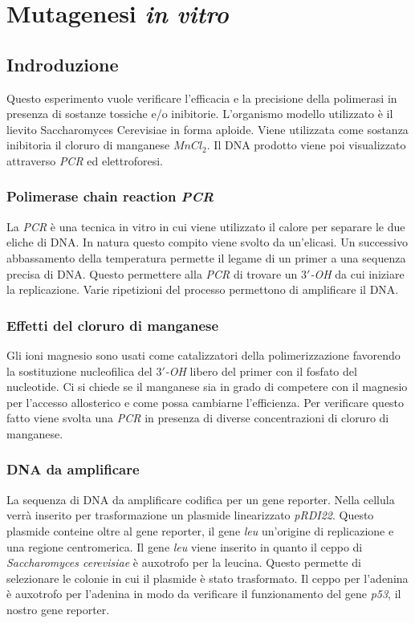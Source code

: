 \section*{Mutagenesi \emph{in vitro}}

	\subsection*{Indroduzione}
        Questo esperimento vuole verificare l'efficacia e la precisione della polimerasi in presenza di sostanze tossiche e/o inibitorie.
        L'organismo modello utilizzato è il lievito Saccharomyces Cerevisiae in forma aploide.
	Viene utilizzata come sostanza inibitoria il cloruro di manganese \emph{$MnCl_2$}.
	Il DNA prodotto viene poi visualizzato attraverso \emph{PCR} ed elettroforesi.
        
		\subsubsection*{Polimerase chain reaction \emph{PCR}}
		La \emph{PCR} \`e una tecnica in vitro in cui viene utilizzato il calore per separare le due eliche di DNA.
		In natura questo compito viene svolto da un'elicasi.
       		Un successivo abbassamento della temperatura permette il legame di un primer a una sequenza precisa di DNA.
		Questo permettere alla \emph{PCR} di trovare un \emph{$3'$-OH} da cui iniziare la replicazione.
		Varie ripetizioni del processo permettono di amplificare il DNA.

		\subsubsection*{Effetti del cloruro di manganese}
		Gli ioni magnesio sono usati come catalizzatori della polimerizzazione favorendo la sostituzione nucleofilica del \emph{$3'$-OH} libero del primer con il fosfato del nucleotide.
		Ci si chiede se il manganese sia in grado di competere con il magnesio per l'accesso allosterico e come possa cambiarne l'efficienza.
		Per verificare questo fatto viene svolta una \emph{PCR} in presenza di diverse concentrazioni di cloruro di manganese.

		\subsubsection*{DNA da amplificare}
        	La sequenza di DNA da amplificare codifica per un gene reporter.
		Nella cellula verrà inserito per trasformazione un plasmide linearizzato \emph{pRDI22}.
		Questo plasmide conteine oltre al gene reporter, il gene \emph{leu} un'origine di replicazione e una regione centromerica.
		Il gene \emph{leu} viene inserito in quanto il ceppo di \emph{Saccharomyces cerevisiae} \`e auxotrofo per la leucina.
		Questo permette di selezionare le colonie in cui il plasmide \`e stato trasformato.
		Il ceppo per l'adenina \`e auxotrofo per l'adenina in modo da verificare il funzionamento del gene \emph{p53}, il nostro gene reporter.

